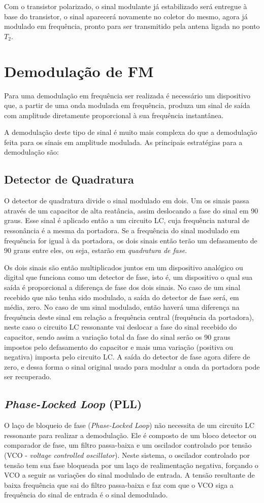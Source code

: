 \documentclass[]{report}
\begin{document}
Com o transistor polarizado, o sinal modulante já estabilizado será entregue à base do transistor, o sinal aparecerá novamente no coletor do mesmo, agora já modulado em frequência, pronto para ser transmitido pela antena ligada no ponto $T_2$.

\section{Demodulação de FM}
Para uma demodulação em frequência ser realizada é necessário um dispositivo que, a partir de uma onda modulada em frequência, produza um sinal de saída com amplitude diretamente proporcional à sua frequência instantânea.

A demodulação deste tipo de sinal é muito mais complexa do que a demodulação feita para os sinais em amplitude modulada. As principais estratégias para a demodulação são:
\subsection{Detector de Quadratura}
O detector de quadratura divide o sinal modulado em dois. Um os sinais passa através de um capacitor de alta reatância, assim deslocando a fase do sinal em 90 graus. Esse sinal é aplicado então a um circuito LC, cuja frequência natural de ressonância é a mesma da portadora. Se a frequência do sinal modulado em frequência for igual à da portadora, os dois sinais então terão um defasamento de 90 graus entre eles, ou seja, estarão em \textit{quadratura de fase}.

Os dois sinais são então multiplicados juntos em um dispositivo analógico ou digital que funciona como um detector de fase, isto é, um dispositivo o qual sua saída é proporcional a diferença de fase dos dois sinais.
No caso de um sinal recebido que não tenha sido modulado, a saída do detector de fase será, em média, zero. No caso de um sinal modulado, então haverá uma diferença na frequência deste sinal em relação a frequência central (frequência da portadora), neste caso o circuito LC ressonante vai deslocar a fase do sinal recebido do capacitor, sendo assim a variação total da fase do sinal serão os 90 graus impostos pelo defasamento do capacitor e mais uma variação (positiva ou negativa) imposta pelo circuito LC. A saída do detector de fase agora difere de zero, e dessa forma o sinal original usado para modular a onda da portadora pode ser recuperado.
\subsection{\textit{Phase-Locked Loop} (PLL)}
O laço de bloqueio de fase (\textit{Phase-Locked Loop}) não necessita de um circuito LC ressonante para realizar a demodulação. Ele é composto de um bloco detector ou comparador de fase, um filtro passa-baixa e um oscilador controlado por tensão (VCO - \textit{voltage controlled oscillator}). Neste sistema, o oscilador controlado por tensão tem sua fase bloqueada por um laço de realimentação negativa, forçando o VCO a seguir as variações do sinal modulado de entrada. A tensão resultante de baixa frequência que sai do filtro passa-baixa e faz com que o VCO siga a frequência do sinal de entrada é o sinal demodulado.
\end{document}

